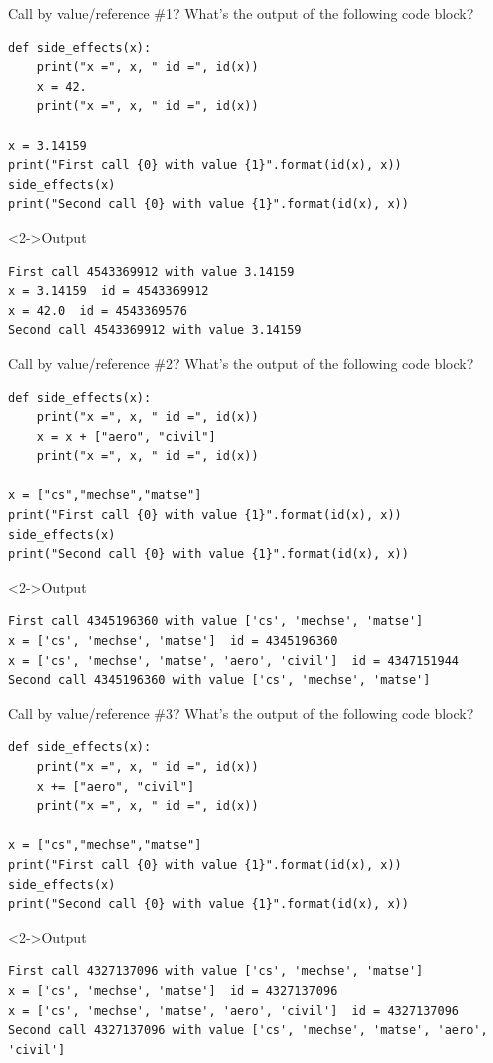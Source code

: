 \documentclass[presentation]{beamer}
\begin{document}
\begin{frame}[label={sec:orgceb2b64},fragile]{Call by value/reference \#1?}
 What's the output of the following code block?
\footnotesize
\begin{verbatim}
def side_effects(x):
    print("x =", x, " id =", id(x))
    x = 42.
    print("x =", x, " id =", id(x))

x = 3.14159
print("First call {0} with value {1}".format(id(x), x))
side_effects(x)
print("Second call {0} with value {1}".format(id(x), x))
\end{verbatim}
\begin{block}<2->{Output}
\footnotesize
\begin{verbatim}
First call 4543369912 with value 3.14159
x = 3.14159  id = 4543369912
x = 42.0  id = 4543369576
Second call 4543369912 with value 3.14159
\end{verbatim}
\end{block}
\end{frame}
\begin{frame}[label={sec:orgd2c83e5},fragile]{Call by value/reference \#2?}
 What's the output of the following code block?
\footnotesize
\begin{verbatim}
def side_effects(x):
    print("x =", x, " id =", id(x))
    x = x + ["aero", "civil"]
    print("x =", x, " id =", id(x))

x = ["cs","mechse","matse"]
print("First call {0} with value {1}".format(id(x), x))
side_effects(x)
print("Second call {0} with value {1}".format(id(x), x))
\end{verbatim}
\begin{block}<2->{Output}
\scriptsize
\begin{verbatim}
First call 4345196360 with value ['cs', 'mechse', 'matse']
x = ['cs', 'mechse', 'matse']  id = 4345196360
x = ['cs', 'mechse', 'matse', 'aero', 'civil']  id = 4347151944
Second call 4345196360 with value ['cs', 'mechse', 'matse']
\end{verbatim}
\end{block}
\end{frame}
\begin{frame}[label={sec:org7dc9e0f},fragile]{Call by value/reference \#3?}
 What's the output of the following code block?
\footnotesize
\begin{verbatim}
def side_effects(x):
    print("x =", x, " id =", id(x))
    x += ["aero", "civil"]
    print("x =", x, " id =", id(x))

x = ["cs","mechse","matse"]
print("First call {0} with value {1}".format(id(x), x))
side_effects(x)
print("Second call {0} with value {1}".format(id(x), x))
\end{verbatim}
\begin{block}<2->{Output}
\scriptsize
\begin{verbatim}
First call 4327137096 with value ['cs', 'mechse', 'matse']
x = ['cs', 'mechse', 'matse']  id = 4327137096
x = ['cs', 'mechse', 'matse', 'aero', 'civil']  id = 4327137096
Second call 4327137096 with value ['cs', 'mechse', 'matse', 'aero', 'civil']
\end{verbatim}
\end{block}
\end{frame}
\end{document}
